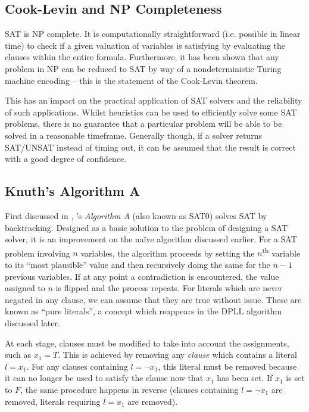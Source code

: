 \documentclass[a4paper,openany,12pt]{book}
\begin{document}
\subsection{Cook-Levin and NP Completeness}

SAT is NP complete.
It is computationally straightforward (i.e. possible in linear time) to check if a given valuation of variables is
satisfying by evaluating the clauses within the entire formula.
Furthermore, it has been shown that any problem in NP can be reduced to SAT by way of a nondeterministic Turing machine
encoding \citep{Cook:1971:CTP:800157.805047} -- this is the statement of the Cook-Levin theorem.

This has an impact on the practical application of SAT solvers and the reliability of such applications.
Whilst heuristics can be used to efficiently solve some SAT problems, there is no guarantee that a particular problem
will be able to be solved in a reasonable timeframe.
Generally though, if a solver returns SAT/UNSAT instead of timing out, it can be assumed that the result is correct with
a good degree of confidence.

\subsection{Knuth's Algorithm A}

First discussed in \citet{Knuth:2015:ACP:2898950}, \citeauthor{Knuth:2015:ACP:2898950}'s \emph{Algorithm A} (also known
as \textsc{SAT0}) solves SAT by backtracking.
Designed as a basic solution to the problem of designing a SAT solver, it is an improvement on the naïve algorithm
discussed earlier.
For a SAT problem involving $n$ variables, the algorithm proceeds by setting the $n$\textsuperscript{th} variable to its
``most plausible'' value and then recursively doing the same for the $n-1$ previous variables.
If at any point a contradiction is encountered, the value assigned to $n$ is flipped and the process repeats.
For literals which are never negated in any clause, we can assume that they are true without issue.
These are known as ``pure literals'', a concept which reappears in the DPLL algorithm discussed later.

At each stage, clauses must be modified to take into account the assignments, such as $x_1 = T$.
This is achieved by removing any \emph{clause} which contains a literal $l = x_1$.
For any clauses containing $l = \neg x_1$, this literal must be removed because it can no longer be used to satisfy the
clause now that $x_1$ has been set. If $x_1$ is set to $F$, the same procedure happens in reverse (clauses containing $l
= \neg x_1$ are removed, literals requiring $l = x_1$ are removed).
\end{document}
